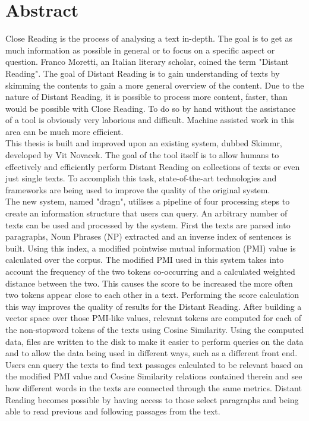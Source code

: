 \section*{Abstract}
Close Reading is the process of analysing a text in-depth. The goal is to get as much information as possible in general or to focus on a specific aspect or question. Franco Moretti, an Italian literary scholar, coined the term "Distant Reading". The goal of Distant Reading is to gain understanding of texts by skimming the contents to gain a more general overview of the content. Due to the nature of Distant Reading, it is possible to process more content, faster, than would be possible with Close Reading. To do so by hand without the assistance of a tool is obviously very laborious and difficult. Machine assisted work in this area can be much more efficient.\\
This thesis is built and improved upon an existing system, dubbed Skimmr, developed by Vit Novacek. The goal of the tool itself is to allow humans to effectively and efficiently perform Distant Reading on collections of texts or even just single texts. To accomplish this task, state-of-the-art technologies and frameworks are being used to improve the quality of the original system.\\
The new system, named "dragn", utilises a pipeline of four processing steps to create an information structure that users can query.
An arbitrary number of texts can be used and processed by the system. First the texts are parsed into paragraphs, Noun Phrases (NP) extracted and an inverse index of sentences is built. Using this index, a modified pointwise mutual information (PMI) value is calculated over the corpus. The modified PMI used in this system takes into account the frequency of the two tokens co-occurring and a calculated weighted distance between the two. This causes the score to be increased the more often two tokens appear close to each other in a text. Performing the score calculation this way improves the quality of results for the Distant Reading. After building a vector space over those PMI-like values, relevant tokens are computed for each of the non-stopword tokens of the texts using Cosine Similarity. Using the computed data, files are written to the disk to make it easier to perform queries on the data and to allow the data being used in different ways, such as a different front end. \\
Users can query the texts to find text passages calculated to be relevant based on the modified PMI value and Cosine Similarity relations contained therein and see how different words in the texts are connected through the same metrics. Distant Reading becomes possible by having access to those select paragraphs and being able to read previous and following passages from the text.
